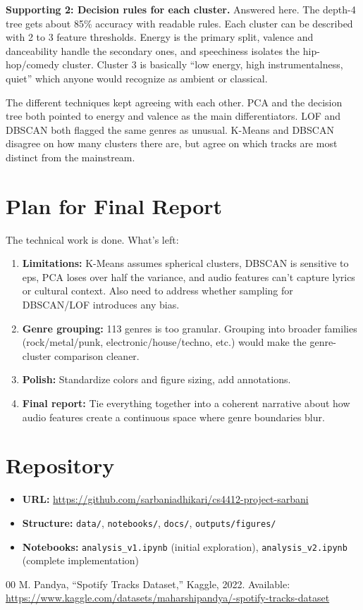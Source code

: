 \documentclass[10pt,twocolumn]{article}
\begin{document}
\textbf{Supporting 2: Decision rules for each cluster.} Answered here. The depth-4 tree gets about 85\% accuracy with readable rules. Each cluster can be described with 2 to 3 feature thresholds. Energy is the primary split, valence and danceability handle the secondary ones, and speechiness isolates the hip-hop/comedy cluster. Cluster 3 is basically ``low energy, high instrumentalness, quiet'' which anyone would recognize as ambient or classical.

The different techniques kept agreeing with each other. PCA and the decision tree both pointed to energy and valence as the main differentiators. LOF and DBSCAN both flagged the same genres as unusual. K-Means and DBSCAN disagree on how many clusters there are, but agree on which tracks are most distinct from the mainstream.

\section{Plan for Final Report}

The technical work is done. What's left:
\begin{enumerate}
    \item \textbf{Limitations:} K-Means assumes spherical clusters, DBSCAN is sensitive to eps, PCA loses over half the variance, and audio features can't capture lyrics or cultural context. Also need to address whether sampling for DBSCAN/LOF introduces any bias.
    \item \textbf{Genre grouping:} 113 genres is too granular. Grouping into broader families (rock/metal/punk, electronic/house/techno, etc.) would make the genre-cluster comparison cleaner.
    \item \textbf{Polish:} Standardize colors and figure sizing, add annotations.
    \item \textbf{Final report:} Tie everything together into a coherent narrative about how audio features create a continuous space where genre boundaries blur.
\end{enumerate}

\section{Repository}

\begin{itemize}
    \item \textbf{URL:} \url{https://github.com/sarbaniadhikari/cs4412-project-sarbani}
    \item \textbf{Structure:} \texttt{data/}, \texttt{notebooks/}, \texttt{docs/}, \texttt{outputs/figures/}
    \item \textbf{Notebooks:} \texttt{analysis\_v1.ipynb} (initial exploration), \texttt{analysis\_v2.ipynb} (complete implementation)
\end{itemize}

\begin{thebibliography}{00}
 M. Pandya, ``Spotify Tracks Dataset,'' Kaggle, 2022. Available: \url{https://www.kaggle.com/datasets/maharshipandya/-spotify-tracks-dataset}
\end{thebibliography}
\end{document}
